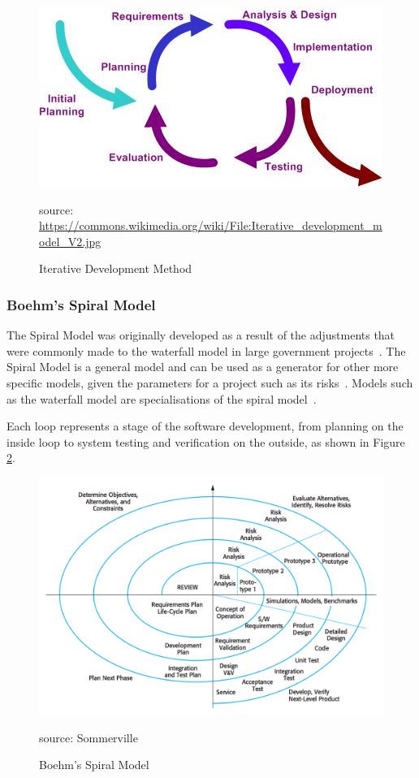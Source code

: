 \documentclass{article}
\begin{document}
\begin{figure}[htb] 
\centering
    \includegraphics[width=0.8\linewidth]{iterativeDevelopment}
\caption{Iterative Development Method}
\small source: \url{https://commons.wikimedia.org/wiki/File:Iterative_development_model_V2.jpg}
\label{fig:iterativeDevelopment}
\end{figure}

\subsubsection{Boehm's Spiral Model}
The Spiral Model was originally developed as a result of the adjustments that were commonly made to the waterfall model in large government projects~\cite{spiralModelSoftwareDevelopment}.  The Spiral Model is a general model and can be used as a generator for other more specific models, given the parameters for a project such as its risks~\cite{boehm2000spiral}.  Models such as the waterfall model are specialisations of the spiral model~\cite{boehm2000spiral}.

Each loop represents a stage of the software development, from planning on the inside loop to system testing and verification on the outside, as shown in Figure \ref{fig:spiralModel}.

\begin{figure}[htb] 
\centering
    \includegraphics[width=0.8\linewidth]{spiralModel}
\caption{Boehm's Spiral Model}
\small source: Sommerville~\cite{sommervilleSoftwareEngineering}
\label{fig:spiralModel}
\end{figure}
\end{document}
